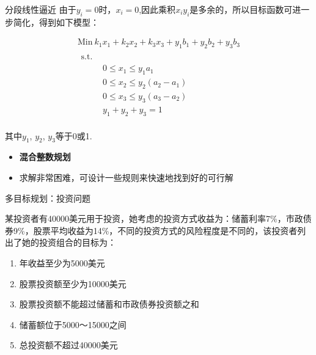 \documentclass[mathserif, table]{beamer}
\begin{document}
\begin{frame}{分段线性逼近}
  由于$y_i = 0$时，$x_i = 0$,因此乘积$x_iy_i$是多余的，所以目标函数可进一步简化，得到如下模型：
  
    \[ 
    \begin{array}{c}
      \mbox{Min}\ k_1x_1 + k_2x_2 + k_3x_3 + y_1b_1 + y_2b_2 + y_3b_3\\
      \begin{array}{ll}
        \mbox{s.t.} & \\
        &
        \begin{array}{l}
          0 \le x_1 \le y_1a_1 \\
          0 \le x_2 \le y_2(a_2 - a_1) \\
          0 \le x_3 \le y_3(a_3 - a_2) \\
          y_1 + y_2 + y_3 = 1
        \end{array}
      \end{array}
    \end{array}
    \]
  
    其中$y_1$, $y_2$, $y_3$等于0或1.

    \begin{itemize}
    \item \textbf{混合整数规划}
    \item 求解非常困难，可设计一些规则来快速地找到好的可行解
    \end{itemize}

\end{frame}

\begin{frame}{多目标规划：投资问题}
  \begin{block}{}
    某投资者有40000美元用于投资，她考虑的投资方式收益为：储蓄利率7\%，市政债券9\%，股票平均收益为14\%，不同的投资方式的风险程度是不同的，该投资者列出了她的投资组合的目标为：
    \begin{enumerate}
    \item 年收益至少为5000美元
    \item 股票投资额至少为10000美元
    \item 股票投资额不能超过储蓄和市政债券投资额之和
    \item 储蓄额位于5000～15000之间
    \item 总投资额不超过40000美元
    \end{enumerate}
  \end{block}
\end{frame}
\end{document}
